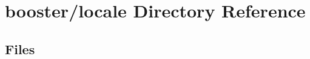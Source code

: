 \section{booster/locale Directory Reference}
\label{dir_16b7a13c3ac6af906251fa16860d5b07}
\subsection*{Files}
\begin{DoxyCompactItemize}
\end{DoxyCompactItemize}
